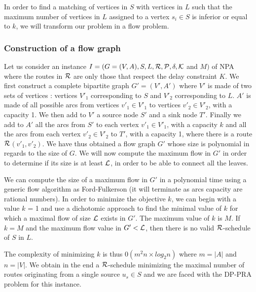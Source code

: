 \documentclass{article}
\newcommand\rschedule{$\cal R$-schedule\xspace}
\begin{document}
In order to find a matching of vertices in $S$ with vertices in $L$ such that the maximum number of vertices in $L$ assigned to a vertex $s_i \in S$ is inferior or equal to $k$, we will transform our problem in a flow problem.

\subsubsection{Construction of a flow graph}

Let us consider an instance $I= (G=(V,A), S, L, \cal R, P, \delta, K$ and $M)$ of NPA where the routes in $\cal R$ are only those that respect the delay constraint $K$. We first construct a complete bipartite graph $G'=(V',A')$ where $V'$ is made of two sets of vertices : vertices $V'_1$ corresponding to $S$ and $V'_2$ corresponding to $ L$. $A'$ is made of all possible arcs from vertices $v'_1 \in V'_1$ to vertices $v'_2 \in V'_2$, with a capacity 1. We then add to $V'$ a source node $S'$ and a sink node $T'$. Finally we add to $A'$ all the arcs from $S'$ to each vertex $v'_1 \in V'_1$, with a capacity $k$  and all the arcs from each vertex $v'_2 \in V'_2$ to $T'$, with a capacity 1, where there is a route $\cal R$$(v'_1, v'_2)$. We have thus obtained a flow graph $G'$ whose size is polynomial in regards to the size of $G$. We will now compute the maximum flow in $G'$ in order to determine if its size is at least $\cal L$, in order to be able to connect all the leaves.

We can compute the size of a maximum flow in $G'$ in a polynomial time using a generic flow algorithm as Ford-Fulkerson (it will terminate as arcs capacity are rational numbers). In order to minimize the objective $k$, we can begin with a value $k$ = 1 and use a dichotomic approach to find the minimal value of $k$ for which a maximal flow of size $\cal L$ exists in $G'$. The maximum value of $k$ is $M$. If $k = M$ and the maximum flow value in $G' < \cal L$, then there is no valid \rschedule of $S$ in $L$.

The complexity of minimizing $k$ is thus $0(m^2n \times log_2 n)$ where $m = |A|$ and $n=|V|$. We obtain in the end a \rschedule minimizing the maximal number of routes originating from a single source $u_s \in S$ and we are faced with the DP-PRA problem for this instance.
\end{document}
